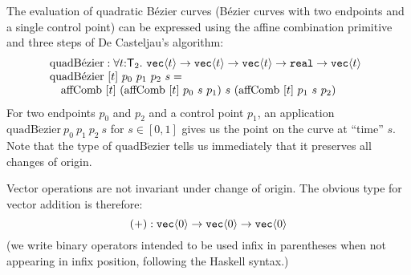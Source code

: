 \begin{example}
  The evaluation of quadratic B\'{e}zier curves (B\'{e}zier curves
  with two endpoints and a single control point) can be expressed
  using the affine combination primitive and three steps of De
  Casteljau's algorithm:
  \begin{displaymath}
    \begin{array}{@{}l}
      \mathrm{quadB\acute{e}zier} : \forall t \mathord:\SynTransl{2}.\ \tyPrim{vec}{t} \to \tyPrim{vec}{t} \to \tyPrim{vec}{t} \to \tyPrimNm{real} \to \tyPrim{vec}{t} \\
      \mathrm{quadB\acute{e}zier}\ [t]\ p_0\ p_1\ p_2\ s = \\
      \quad \mathrm{affComb}\ [t]\ (\mathrm{affComb}\ [t]\ p_0\ s\ p_1)\ s\ (\mathrm{affComb}\ [t]\ p_1\ s\ p_2) \\
    \end{array}
  \end{displaymath}
  For two endpoints $p_0$ and $p_2$ and a control point $p_1$, an
  application $\mathrm{quadB\acute{e}zier}\ p_0\ p_1\ p_2\ s$ for $s
  \in [0,1]$ gives us the point on the curve at ``time'' $s$. Note
  that the type of $\mathrm{quadB\acute{e}zier}$ tells us immediately
  that it preserves all changes of origin.
\end{example}


Vector operations are not invariant under change of origin. The
obvious type for vector addition is therefore:
\begin{displaymath}
  (+) : \texttt{vec}\langle 0 \rangle \to \texttt{vec}\langle 0 \rangle \to \texttt{vec}\langle 0 \rangle
\end{displaymath}
(we write binary operators intended to be used infix in parentheses
when not appearing in infix position, following the Haskell
syntax.)

